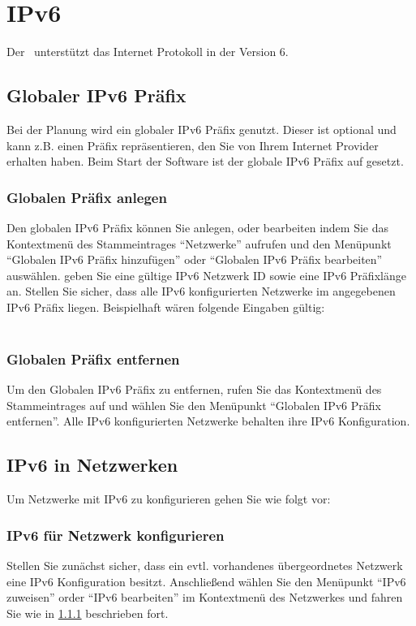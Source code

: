 \section{IPv6}
Der \subnetcalc\ unterstützt das Internet Protokoll in der Version 6.

\subsection{Globaler IPv6 Präfix}
Bei der Planung wird ein globaler IPv6 Präfix genutzt. Dieser ist optional und
kann z.B. einen Präfix repräsentieren, den Sie von Ihrem Internet Provider
erhalten haben.
Beim Start der Software ist der globale IPv6 Präfix auf 
gesetzt. 

\subsubsection{Globalen Präfix anlegen}
\label{IPv6GlobalZuweisen}
Den globalen IPv6 Präfix können Sie anlegen, oder bearbeiten indem Sie das
Kontextmenü des Stammeintrages "`Netzwerke"' aufrufen und den Menüpunkt
"`Globalen IPv6 Präfix hinzufügen"' oder "`Globalen IPv6 Präfix bearbeiten"'
auswählen. geben Sie eine gültige IPv6 Netzwerk ID sowie eine IPv6 Präfixlänge
an. Stellen Sie sicher, dass alle IPv6 konfigurierten Netzwerke im
angegebenen IPv6 Präfix liegen.
Beispielhaft wären folgende Eingaben gültig:\\
\\

\subsubsection{Globalen Präfix entfernen}
Um den Globalen IPv6 Präfix zu entfernen, rufen Sie das Kontextmenü des
Stammeintrages auf und wählen Sie den Menüpunkt "`Globalen IPv6 Präfix entfernen"'.
Alle IPv6 konfigurierten Netzwerke behalten ihre IPv6 Konfiguration.

\subsection{IPv6 in Netzwerken}
Um Netzwerke mit IPv6 zu konfigurieren gehen Sie wie folgt vor:

\subsubsection{IPv6 für Netzwerk konfigurieren}
Stellen Sie zunächst sicher, dass ein evtl. vorhandenes übergeordnetes Netzwerk
eine IPv6 Konfiguration besitzt. Anschließend wählen Sie den Menüpunkt
"`IPv6 zuweisen"' order "`IPv6 bearbeiten"' im Kontextmenü des Netzwerkes und
fahren Sie wie in \ref{IPv6GlobalZuweisen} beschrieben fort.

